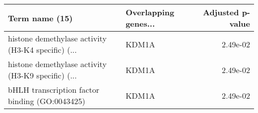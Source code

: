 \begin{tabular}{llr}
\toprule
                                    Term name (15) & Overlapping genes... &  Adjusted p-value \\
\midrule
histone demethylase activity (H3-K4 specific) (... &                KDM1A &          2.49e-02 \\
histone demethylase activity (H3-K9 specific) (... &                KDM1A &          2.49e-02 \\
    bHLH transcription factor binding (GO:0043425) &                KDM1A &          2.49e-02 \\
\bottomrule
\end{tabular}
